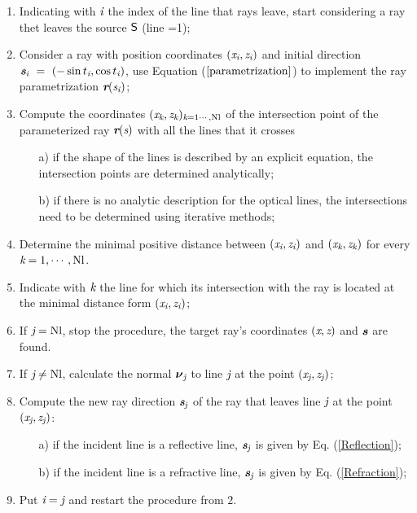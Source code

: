 \begin{enumerate}
\item Indicating with $\textit{i}$ the index of the line that rays leave, start considering a ray thet leaves the source $\textsf{S}$ (line =1);
 \item Consider a ray with position coordinates $(\textit{x}_{\textit{i}}, \textit{z}_{\textit{i}})$ and initial direction $\textit{\textbf{s}}_{\textit{i}}~=~(-\sin t_{\textit{i}}, \cos t_{\textit{i}})$, use Equation ($\ref{parametrization}$) to implement the ray parametrization $\textit{\textbf{r}}(\textit{s}_{\textit{i}})$;
\item Compute the coordinates $(\textit{x}_{\textit{k}}, \textit{z}_{\textit{k}})_{\textit{k} = 1\cdots, \textrm{Nl}}$ of the intersection point of the parameterized ray $\textit{\textbf{r}}(\textit{s})$ with all the lines that it crosses
\begin{itemize}
\item[a)] if the shape of the lines is described by an explicit equation, the intersection points are determined analytically;
\item[b)] if there is no analytic description for the optical lines, the intersections need to be determined using iterative methods;
\end{itemize}
\item  Determine the minimal positive distance between $(\textit{x}_{\textit{i}}, \textit{z}_{\textit{i}})$ and $(\textit{x}_{\textit{k}}, \textit{z}_{\textit{k}})$ for every $\textit{k}=1, \cdots, \textrm{Nl}$.
\item Indicate with $\textit{k}$ the line for which its intersection with the ray is located at the minimal distance form $(\textit{x}_{\textit{i}}, \textit{z}_{\textit{i}})$;
\item If $\textit{j} = \textrm{Nl}$, stop the procedure, the target ray's coordinates $(\textit{x}, \textit{z})$ and $\textit{\textbf{s}}$ are found.
\item If $\textit{j} \neq \textrm{Nl}$, calculate the normal $\boldsymbol{\nu}_{\textit{j}}$ to line $\textit{j}$ at the point $(\textit{x}_{\textit{j}}, \textit{z}_{\textit{j}})$;
 \item Compute the new ray direction $\textit{\textbf{s}}_{\textit{j}}$ of the ray that leaves line $\textit{j}$ at the point $(\textit{x}_{\textit{j}}, \textit{z}_{\textit{j}})$:
\begin{itemize}
\item[a)] if the incident line is a reflective line, $\textit{\textbf{s}}_{\textit{j}}$ is given by Eq. (\ref{Reflection});
\item[b)] if the incident line is a refractive line, $\textit{\textbf{s}}_{\textit{j}}$ is given by Eq. (\ref{Refraction});
\end{itemize}
\item Put $\textit{i}=\textit{j}$ and restart the procedure from $2.$
\end{enumerate}
